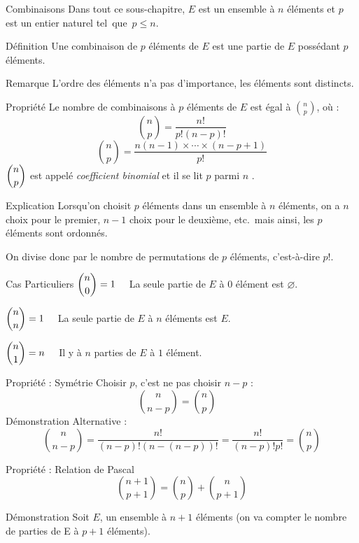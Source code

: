 \documentclass{coursbook}
\begin{document}
    \begin{Gpartie}{Combinaisons}
        Dans tout ce sous-chapitre, $E$ est un ensemble à $n$ éléments et $p$ est un entier naturel tel~que~$p\leq n$.
        \begin{Spartie}{Définition}
            Une combinaison de $p$ éléments de $E$ est une partie de $E$ possédant $p$ éléments.
            \begin{SSpartie}{Remarque}
                L'ordre des éléments n'a pas d'importance, les éléments sont distincts.
            \end{SSpartie}
        \end{Spartie}
        \pagebreak

        \begin{Spartie}{Propriété}
            Le nombre de combinaisons à $p$ éléments de $E$ est égal à $\binom{n}{p}$, où :
            \[\binom{n}{p}=\dfrac{n!}{p!(n-p)!}\]
            \[\binom{n}{p}=\dfrac{n(n-1)\times\dotsb\times(n-p+1)}{p!}\]
            $\dbinom{n}{p}$ est appelé \emph{coefficient binomial} et il se lit \og $p$ parmi $n$ \fg{}.
            \begin{SSpartie}{Explication}
                Lorsqu'on choisit $p$ éléments dans un ensemble à $n$ éléments, on a $n$ choix pour le premier, $n-1$ choix pour le deuxième, etc.\ mais ainsi, les $p$ éléments sont ordonnés.

                On divise donc par le nombre de permutations de $p$ éléments, c'est-à-dire $p!$.
            \end{SSpartie}
            \begin{SSpartie}{Cas Particuliers}
                $\dbinom{n}{0}=1\quad$ La seule partie de $E$ à $0$ élément est $\varnothing$.

                $\dbinom{n}{n}=1\quad$ La seule partie de $E$ à $n$ éléments est $E$.

                $\dbinom{n}{1}=n\quad$ Il y à $n$ parties de $E$ à $1$ élément.
            \end{SSpartie}
        \end{Spartie}
        \begin{Spartie}{Propriété : Symétrie}
            Choisir $p$, c'est ne pas choisir $n-p$ :
            \[\binom{n}{n-p}=\binom{n}{p}\quad\]
            Démonstration Alternative : 
            \[\binom{n}{n-p}=\dfrac{n!}{(n-p)!(n-(n-p))!}=\dfrac{n!}{(n-p)!p!}=\binom{n}{p}\]
        \end{Spartie}
        \begin{Spartie}{Propriété : Relation de Pascal}
            \[\binom{n+1}{p+1}=\binom{n}{p}+\binom{n}{p+1}\]
            \begin{SSpartie}{Démonstration}
                Soit $E$, un ensemble à $n+1$ éléments (on va compter le nombre de parties de E à $p+1$ éléments).


\end{SSpartie}
\end{Spartie}
\end{Gpartie}
\end{document}
